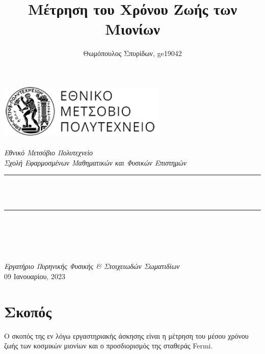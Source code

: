 \documentclass[a4paper]{book}
\title{Μέτρηση του Χρόνου Ζωής των Μιονίων}
\author{Θωμόπουλος Σπυρίδων, ge19042}
\begin{document}
%

\begin{titlepage}

\newcommand{\HRule}{\rule{\linewidth}{0.5mm}}
\includegraphics[width=8cm]{logo1}\\[1cm] 
\center 
\quad\\[1.5cm]
\textsl{\Large Εθνικό Μετσόβιο Πολυτεχνείο}\\[0.5cm] 
\textsl{\large Σχολή Εφαρμοσμένων Μαθηματικών και Φυσικών Επιστημών}\\[0.5cm] 
\makeatletter
\HRule \\[0.4cm]
{ \huge \bfseries \@title}\\[0.4cm] 
\HRule \\[1.5cm]
\begin{minipage}{0.4\textwidth}
\begin{flushleft} \large
\@author 
\end{flushleft}
\end{minipage}
~
\begin{minipage}{0.4\textwidth}
\begin{flushright} \large
\end{flushright}
\end{minipage}\\[3cm]
\makeatother
{\large \emph{Εργατήριο Πυρηνικής Φυσικής \& Στοιχειωδών Σωματιδίων}}\\[0.5cm]
{\large 09 Ιανουαρίου, 2023}
\vfill 

\end{titlepage}

\section*{Σκοπός}
	Ο σκοπός της εν λόγω εργαστηριακής άσκησης είναι η μέτρηση του μέσου χρόνου ζωής των κοσμικών μιονίων και ο προσδιορισμός της σταθεράς Fermi.
	
\end{document}

